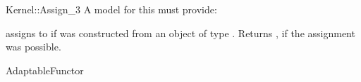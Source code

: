 \begin{ccRefFunctionObjectConcept}{Kernel::Assign_3}
A model for this must provide:


{assigns  to  if 
was constructed from an object of type .
Returns , if the assignment was possible.}

\ccRefines
AdaptableFunctor

\ccSeeAlso
{} \\
 \\
 \\
  \\

\end{ccRefFunctionObjectConcept}
